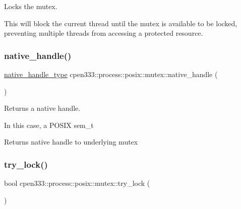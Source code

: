 Locks the mutex. 

This will block the current thread until the mutex is available to be locked, preventing multiple threads from accessing a protected resource. \mbox{\label{classcpen333_1_1process_1_1posix_1_1mutex_aa36462cbd2181e20caa35656c619c6dd}} 
\subsubsection{\texorpdfstring{native\+\_\+handle()}{native\_handle()}}
{\footnotesize\ttfamily \hyperlink{classcpen333_1_1process_1_1posix_1_1mutex_aac6d3675fcffc52ddf281e952968e44b}{native\+\_\+handle\+\_\+type} cpen333\+::process\+::posix\+::mutex\+::native\+\_\+handle (\begin{DoxyParamCaption}{ }\end{DoxyParamCaption})\hspace{0.3cm}{\ttfamily [inline]}}



Returns a native handle. 

In this case, a P\+O\+S\+IX sem\+\_\+t

\begin{DoxyReturn}{Returns}
native handle to underlying mutex 
\end{DoxyReturn}
\mbox{\label{classcpen333_1_1process_1_1posix_1_1mutex_ae19f7c8370308f7333cee340fef91049}} 
\subsubsection{\texorpdfstring{try\+\_\+lock()}{try\_lock()}}
{\footnotesize\ttfamily bool cpen333\+::process\+::posix\+::mutex\+::try\+\_\+lock (\begin{DoxyParamCaption}{ }\end{DoxyParamCaption})\hspace{0.3cm}{\ttfamily [inline]}}



